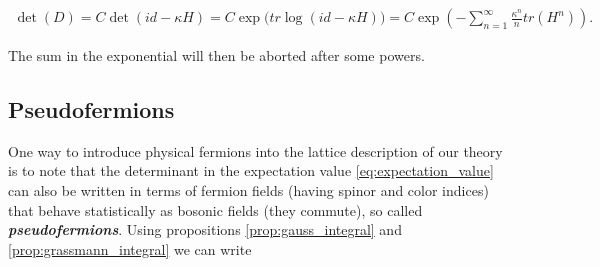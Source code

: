 \documentclass{article}
\theoremstyle{plain} %
\theoremstyle{convention} %
\theoremstyle{remark} %
\def\df#1{\textbf{\textit{#1}}}
\numberwithin{equation}{section}
\begin{document}
\begin{align*}
    \det(D) = C \det(id - \kappa H) = C \exp\big(tr \log(id - \kappa H)\big) = C \exp(- \sum_{n=1}^{\infty} \frac{\kappa^n}{n} tr(H^n)).
\end{align*}

The sum in the exponential will then be aborted after some powers.

\subsection{Pseudofermions}

One way to introduce physical fermions into the lattice description of our theory is to note that the determinant in the expectation value \eqref{eq:expectation_value} can also be written in terms of fermion fields (having spinor and color indices) that behave statistically as bosonic fields (they commute), so called \df{pseudofermions}. Using propositions \ref{prop:gauss_integral} and \ref{prop:grassmann_integral} we can write
\end{document}
